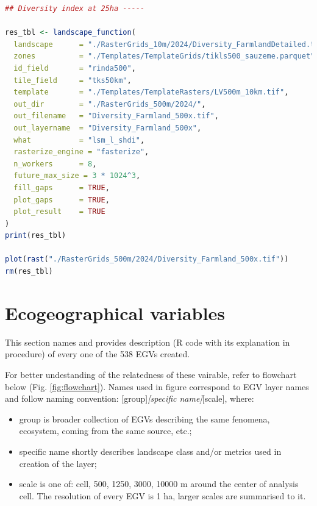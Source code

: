 \documentclass[
]{book}
\begin{document}
\begin{lstlisting}[language=R]
## Diversity index at 25ha -----

res_tbl <- landscape_function(
  landscape      = "./RasterGrids_10m/2024/Diversity_FarmlandDetailed.tif",
  zones          = "./Templates/TemplateGrids/tikls500_sauzeme.parquet",
  id_field       = "rinda500",
  tile_field     = "tks50km",
  template       = "./Templates/TemplateRasters/LV500m_10km.tif",
  out_dir        = "./RasterGrids_500m/2024/",
  out_filename   = "Diversity_Farmland_500x.tif",
  out_layername  = "Diversity_Farmland_500x",
  what           = "lsm_l_shdi",
  rasterize_engine = "fasterize",
  n_workers      = 8,
  future_max_size = 3 * 1024^3,
  fill_gaps      = TRUE,
  plot_gaps      = TRUE,
  plot_result    = TRUE
)
print(res_tbl)

plot(rast("./RasterGrids_500m/2024/Diversity_Farmland_500x.tif"))
rm(res_tbl)
\end{lstlisting}

\chapter{Ecogeographical variables}\label{Ch06}

This section names and provides description (R code with its explanation in
procedure) of every one of the 538 EGVs created.

For better undestanding of the relatedness of these vairable, refer to flowchart below
(Fig. \ref{fig:flowchart}).
Names used in figure correspond to EGV layer names and follow naming convention:
{[}group{]}\emph{{[}specific name{]}}{[}scale{]}, where:

\begin{itemize}
\item
  group is broader collection of EGVs describing the same fenomena, ecosystem, coming from the same source, etc.;
\item
  specific name shortly describes landscape class and/or metrics used in creation of the layer;
\item
  scale is one of: cell, 500, 1250, 3000, 10000 m around the center of analysis cell. The resolution of every EGV is 1 ha, larger scales are summarised to it.
\end{itemize}
\end{document}
